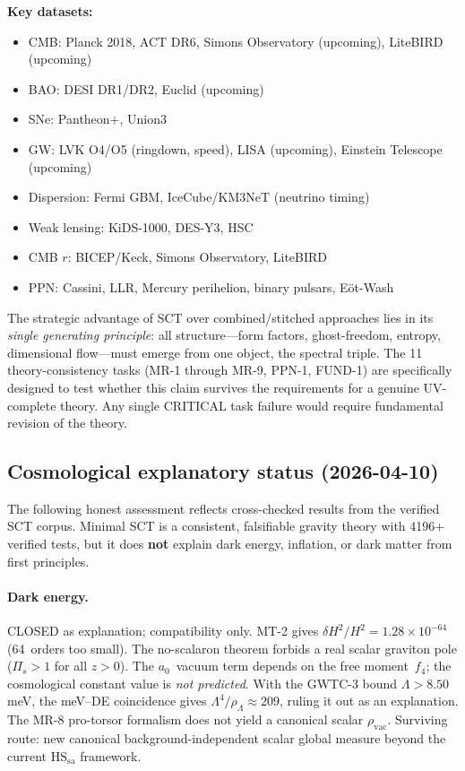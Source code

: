 \documentclass[12pt,a4paper]{article}
\begin{document}
\textbf{Key datasets:}
\begin{itemize}
  \item CMB: Planck 2018, ACT DR6, Simons Observatory (upcoming), LiteBIRD (upcoming)
  \item BAO: DESI DR1/DR2, Euclid (upcoming)
  \item SNe: Pantheon+, Union3
  \item GW: LVK O4/O5 (ringdown, speed), LISA (upcoming), Einstein Telescope (upcoming)
  \item Dispersion: Fermi GBM, IceCube/KM3NeT (neutrino timing)
  \item Weak lensing: KiDS-1000, DES-Y3, HSC
  \item CMB $r$: BICEP/Keck, Simons Observatory, LiteBIRD
  \item PPN: Cassini, LLR, Mercury perihelion, binary pulsars, E\"ot-Wash
\end{itemize}

The strategic advantage of SCT over combined/stitched approaches lies in its
\emph{single generating principle}: all structure---form factors, ghost-freedom,
entropy, dimensional flow---must emerge from one object, the spectral triple.
The 11 theory-consistency tasks (MR-1 through MR-9, PPN-1, FUND-1) are
specifically designed to test whether this claim survives the requirements
for a genuine UV-complete theory.
Any single CRITICAL task failure would require fundamental revision of the theory.

\subsection{Cosmological explanatory status (2026-04-10)}
\label{sec:cosmo-status}

The following honest assessment reflects cross-checked results from the
verified SCT corpus.  Minimal SCT is a consistent, falsifiable gravity
theory with 4196+ verified tests, but it does \textbf{not} explain dark
energy, inflation, or dark matter from first principles.

\paragraph{Dark energy.}
\textcolor{long}{CLOSED as explanation; compatibility only.}
MT-2 gives $\delta H^2/H^2 = 1.28 \times 10^{-64}$ (64~orders too small).
The no-scalaron theorem forbids a real scalar graviton pole
($\Pi_s > 1$ for all $z > 0$).
The $a_0$~vacuum term depends on the free moment~$f_4$; the cosmological
constant value is \emph{not predicted}.
With the GWTC-3 bound $\Lambda > 8.50$\,meV, the meV--DE coincidence
gives $\Lambda^4/\rho_\Lambda \approx 209$, ruling it out as an explanation.
The MR-8 pro-torsor formalism does not yield a canonical scalar
$\rho_{\mathrm{vac}}$.
Surviving route: new canonical background-independent scalar global
measure beyond the current $\mathrm{HS}_{\mathrm{sa}}$ framework.
\end{document}
